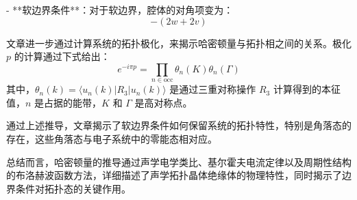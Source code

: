 - **软边界条件**：对于软边界，腔体的对角项变为：
  \[
  - (2w + 2v)
  \]


文章进一步通过计算系统的拓扑极化，来揭示哈密顿量与拓扑相之间的关系。极化 \( p \) 的计算通过下式给出：
\[
e^{-i \pi p} = \prod_{n \in \text{occ}} \theta_n(K) \theta_n(\Gamma)
\]
其中，\( \theta_n(k) = \langle u_n(k) | R_3 | u_n(k) \rangle \) 是通过三重对称操作 \( R_3 \) 计算得到的本征值，\( n \) 是占据的能带，\( K \) 和 \( \Gamma \) 是高对称点。


通过上述推导，文章揭示了软边界条件如何保留系统的拓扑特性，特别是角落态的存在，这些角落态与电子系统中的零能态相对应。

总结而言，哈密顿量的推导通过声学电学类比、基尔霍夫电流定律以及周期性结构的布洛赫波函数方法，详细描述了声学拓扑晶体绝缘体的物理特性，同时揭示了边界条件对拓扑态的关键作用。